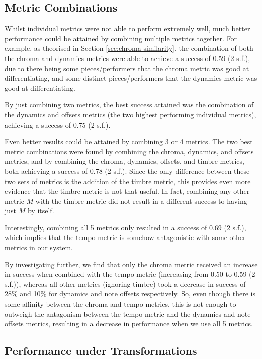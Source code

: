 \documentclass[oneside, class=book, 12pt, crop=false]{standalone}
\begin{document}
\subsection{Metric Combinations}

Whilst individual metrics were not able to perform extremely well, much better performance could be attained by combining multiple metrics together. For example, as theorised in Section \ref{sec:chroma similarity}, the combination of both the chroma and dynamics metrics were able to achieve a success of 0.59 (2 s.f.), due to there being some pieces/performers that the chroma metric was good at differentiating, and some distinct pieces/performers that the dynamics metric was good at differentiating.

By just combining two metrics, the best success attained was the combination of the dynamics and offsets metrics (the two highest performing individual metrics), achieving a success of 0.75 (2 s.f.).

Even better results could be attained by combining 3 or 4 metrics. The two best metric combinations were found by combining the chroma, dynamics, and offsets metrics, and by combining the chroma, dynamics, offsets, and timbre metrics, both achieving a success of 0.78 (2 s.f.). Since the only difference between these two sets of metrics is the addition of the timbre metric, this provides even more evidence that the timbre metric is not that useful. In fact, combining any other metric $M$ with the timbre metric did not result in a different success to having just $M$ by itself.

Interestingly, combining all 5 metrics only resulted in a success of 0.69 (2 s.f.), which implies that the tempo metric is somehow antagonistic with some other metrics in our system.

By investigating further, we find that only the chroma metric received an increase in success when combined with the tempo metric (increasing from 0.50 to 0.59 (2 s.f.)), whereas all other metrics (ignoring timbre) took a decrease in success of 28\% and 10\% for dynamics and note offsets respectively. So, even though there is some affinity between the chroma and tempo metrics, this is not enough to outweigh the antagonism between the tempo metric and the dynamics and note offsets metrics, resulting in a decrease in performance when we use all 5 metrics.

\subsection{Performance under Transformations}
\end{document}
